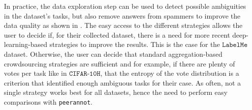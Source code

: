 In practice, the data exploration step can be used to detect possible ambiguities in the dataset's tasks, but also remove answers from spammers to improve the data quality as shown in .
The easy access to the different strategies allows the user to decide if, for their collected dataset, there is a need for more recent deep-learning-based strategies to improve the results.
This is the case for the $\texttt{LabelMe}$ dataset.
Otherwise, the user can decide that standard aggregation-based crowdsourcing strategies are sufficient and for example, if there are plenty of votes per task like in $\texttt{CIFAR-10H}$, that the entropy of the vote distribution is a criterion that identified enough ambiguous tasks for their case.
As often, not a single strategy works best for all datasets, hence the need to perform easy comparisons with \texttt{peerannot}.

